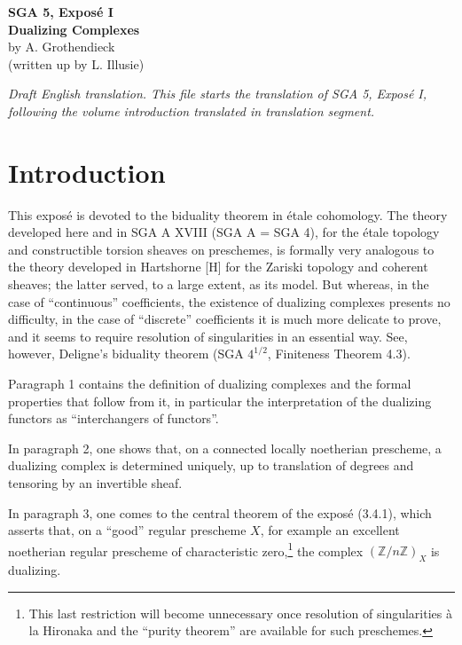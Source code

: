\documentclass[11pt,a4paper]{article}
\newcommand{\Z}{\mathbb{Z}}
\theoremstyle{plain}
\theoremstyle{definition}
\begin{document}
\begin{center}
{\Large\textbf{SGA 5, Exposé I}}\\[0.35em]
{\Large\textbf{Dualizing Complexes}}\\[0.35em]
by A. Grothendieck\\
(written up by L. Illusie)
\end{center}

\bigskip

\noindent\textit{Draft English translation. This file starts the translation of SGA 5, Exposé I, following the volume introduction translated in translation segment.}

\section*{Introduction}

This exposé is devoted to the biduality theorem in étale cohomology. The theory developed here and in SGA A XVIII (SGA A = SGA 4), for the étale topology and constructible torsion sheaves on preschemes, is formally very analogous to the theory developed in Hartshorne [H] for the Zariski topology and coherent sheaves; the latter served, to a large extent, as its model. But whereas, in the case of ``continuous'' coefficients, the existence of dualizing complexes presents no difficulty, in the case of ``discrete'' coefficients it is much more delicate to prove, and it seems to require resolution of singularities in an essential way. See, however, Deligne's biduality theorem (SGA $4^{1/2}$, Finiteness Theorem 4.3).

Paragraph 1 contains the definition of dualizing complexes and the formal properties that follow from it, in particular the interpretation of the dualizing functors as ``interchangers of functors''.

In paragraph 2, one shows that, on a connected locally noetherian prescheme, a dualizing complex is determined uniquely, up to translation of degrees and tensoring by an invertible sheaf.

In paragraph 3, one comes to the central theorem of the exposé (3.4.1), which asserts that, on a ``good'' regular prescheme $X$, for example an excellent noetherian regular prescheme of characteristic zero,\footnote{This last restriction will become unnecessary once resolution of singularities à la Hironaka and the ``purity theorem'' are available for such preschemes.} the complex $(\Z/n\Z)_X$ is dualizing.
\end{document}
